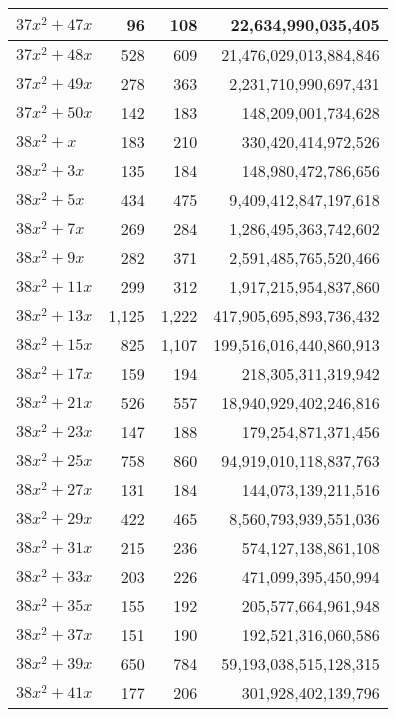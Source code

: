 \documentclass[a4paper]{amsproc}
\theoremstyle{plain}
\theoremstyle{named}
\begin{document}
\begin{longtable}{ | l | r | r | r | }
$37x^2 + 47x$ & 96 & 108 & 22{,}634{,}990{,}035{,}405 \\ \hline
$37x^2 + 48x$ & 528 & 609 & 21{,}476{,}029{,}013{,}884{,}846 \\ \hline
$37x^2 + 49x$ & 278 & 363 & 2{,}231{,}710{,}990{,}697{,}431 \\ \hline
$37x^2 + 50x$ & 142 & 183 & 148{,}209{,}001{,}734{,}628 \\ \hline
$38x^2 + x$ & 183 & 210 & 330{,}420{,}414{,}972{,}526 \\ \hline
$38x^2 + 3x$ & 135 & 184 & 148{,}980{,}472{,}786{,}656 \\ \hline
$38x^2 + 5x$ & 434 & 475 & 9{,}409{,}412{,}847{,}197{,}618 \\ \hline
$38x^2 + 7x$ & 269 & 284 & 1{,}286{,}495{,}363{,}742{,}602 \\ \hline
$38x^2 + 9x$ & 282 & 371 & 2{,}591{,}485{,}765{,}520{,}466 \\ \hline
$38x^2 + 11x$ & 299 & 312 & 1{,}917{,}215{,}954{,}837{,}860 \\ \hline
$38x^2 + 13x$ & 1{,}125 & 1{,}222 & 417{,}905{,}695{,}893{,}736{,}432 \\ \hline
$38x^2 + 15x$ & 825 & 1{,}107 & 199{,}516{,}016{,}440{,}860{,}913 \\ \hline
$38x^2 + 17x$ & 159 & 194 & 218{,}305{,}311{,}319{,}942 \\ \hline
$38x^2 + 21x$ & 526 & 557 & 18{,}940{,}929{,}402{,}246{,}816 \\ \hline
$38x^2 + 23x$ & 147 & 188 & 179{,}254{,}871{,}371{,}456 \\ \hline
$38x^2 + 25x$ & 758 & 860 & 94{,}919{,}010{,}118{,}837{,}763 \\ \hline
$38x^2 + 27x$ & 131 & 184 & 144{,}073{,}139{,}211{,}516 \\ \hline
$38x^2 + 29x$ & 422 & 465 & 8{,}560{,}793{,}939{,}551{,}036 \\ \hline
$38x^2 + 31x$ & 215 & 236 & 574{,}127{,}138{,}861{,}108 \\ \hline
$38x^2 + 33x$ & 203 & 226 & 471{,}099{,}395{,}450{,}994 \\ \hline
$38x^2 + 35x$ & 155 & 192 & 205{,}577{,}664{,}961{,}948 \\ \hline
$38x^2 + 37x$ & 151 & 190 & 192{,}521{,}316{,}060{,}586 \\ \hline
$38x^2 + 39x$ & 650 & 784 & 59{,}193{,}038{,}515{,}128{,}315 \\ \hline
$38x^2 + 41x$ & 177 & 206 & 301{,}928{,}402{,}139{,}796 \\ \hline

\end{longtable}
\end{document}
